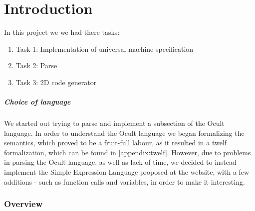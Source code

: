 \chapter{Introduction}

In this project we we had there tasks:
\begin{enumerate}
\item Task 1: Implementation of universal machine specification
\item Task 2: Parse
\item Task 3: 2D code generator 
\end{enumerate}

\paragraph{Choice of language}
We started out trying to parse and implement a subsection of the Ocult
language. In order to understand the Ocult language we began
formalizing the semantics, which proved to be a fruit-full labour, as
it resulted in a twelf formalization, which can be found in
\ref{appendix:twelf}. However, due to problems in parsing the Ocult
language, as well as lack of time, we decided to instead implement the
Simple Expression Language proposed at the website, with a few
additions - such as function calls and variables, in order to make it interesting.

\subsection{Overview}


